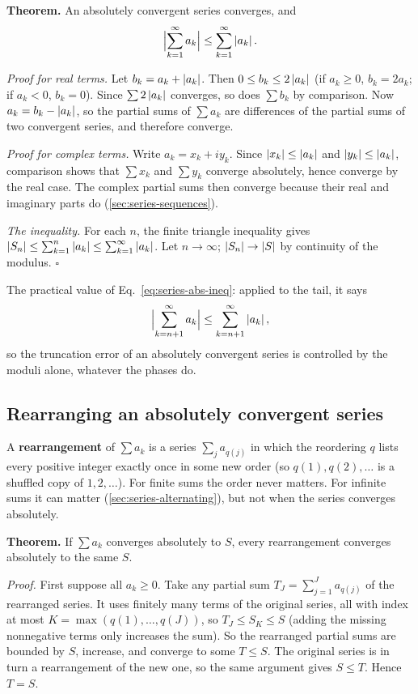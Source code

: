 \textbf{Theorem.} An absolutely convergent series converges, and
\begin{equation}
\Bigl|\sum_{k=1}^\infty a_k\Bigr|\le\sum_{k=1}^\infty\left\lvert a_k\right\rvert.
\label{eq:series-abs-ineq}
\end{equation}

\emph{Proof for real terms.} Let $b_k=a_k+\left\lvert a_k\right\rvert$. Then $0\le b_k\le2\left\lvert a_k\right\rvert$ (if $a_k\ge0$, $b_k=2a_k$; if $a_k<0$, $b_k=0$). Since $\sum2\left\lvert a_k\right\rvert$ converges, so does $\sum b_k$ by comparison. Now $a_k=b_k-\left\lvert a_k\right\rvert$, so the partial sums of $\sum a_k$ are differences of the partial sums of two convergent series, and therefore converge.

\emph{Proof for complex terms.} Write $a_k=x_k+iy_k$. Since $\left\lvert x_k\right\rvert\le\left\lvert a_k\right\rvert$ and $\left\lvert y_k\right\rvert\le\left\lvert a_k\right\rvert$, comparison shows that $\sum x_k$ and $\sum y_k$ converge absolutely, hence converge by the real case. The complex partial sums then converge because their real and imaginary parts do (\cref{sec:series-sequences}).

\emph{The inequality.} For each $n$, the finite triangle inequality gives $\left\lvert S_n\right\rvert\le\sum_{k=1}^n\left\lvert a_k\right\rvert\le\sum_{k=1}^\infty\left\lvert a_k\right\rvert$. Let $n\to\infty$; $\left\lvert S_n\right\rvert\to\left\lvert S\right\rvert$ by continuity of the modulus. $\square$

The practical value of Eq.~\eqref{eq:series-abs-ineq}: applied to the tail, it says
\[
\Bigl|\sum_{k=n+1}^\infty a_k\Bigr|\le\sum_{k=n+1}^\infty\left\lvert a_k\right\rvert,
\]
so the truncation error of an absolutely convergent series is controlled by the moduli alone, whatever the phases do.

\subsection{Rearranging an absolutely convergent series}

A \textbf{rearrangement} of $\sum a_k$ is a series $\sum_j a_{q(j)}$ in which the reordering $q$ lists every positive integer exactly once in some new order (so $q(1),q(2),\dots$ is a shuffled copy of $1,2,\dots$). For finite sums the order never matters. For infinite sums it can matter (\cref{sec:series-alternating}), but not when the series converges absolutely.

\textbf{Theorem.} If $\sum a_k$ converges absolutely to $S$, every rearrangement converges absolutely to the same $S$.

\emph{Proof.} First suppose all $a_k\ge0$. Take any partial sum $T_J=\sum_{j=1}^Ja_{q(j)}$ of the rearranged series. It uses finitely many terms of the original series, all with index at most $K=\max(q(1),\dots,q(J))$, so $T_J\le S_K\le S$ (adding the missing nonnegative terms only increases the sum). So the rearranged partial sums are bounded by $S$, increase, and converge to some $T\le S$. The original series is in turn a rearrangement of the new one, so the same argument gives $S\le T$. Hence $T=S$.

